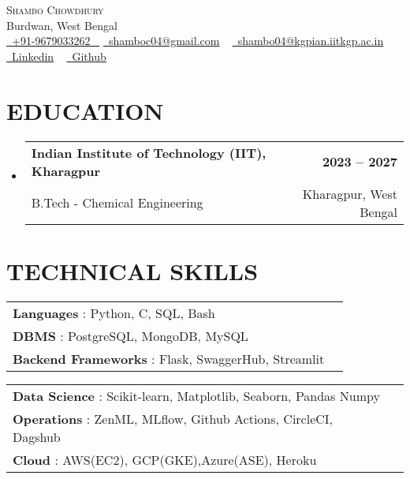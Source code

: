 \documentclass[letterpaper,11pt]{article}
\makeatletter
\newcommand{\resumeSubheading}[4]{
  \vspace{-2pt}\item
    \begin{tabular*}{1.0\textwidth}[t]{l@{\extracolsep{\fill}}r}
      \textbf{\large#1} & \textbf{\small #2} \\
      {\large#3} & {\small #4} \\
      
    \end{tabular*}\vspace{-7pt}
}
\newcommand{\resumeSubHeadingListStart}{\begin{itemize}[leftmargin=0.0in, label={}]}
\newcommand{\resumeSubHeadingListEnd}{\end{itemize}}
\makeatother
\begin{document}
\begin{center}
    {\Huge \scshape Shambo Chowdhury} \\ \vspace{1pt}
    Burdwan, West Bengal \\ \vspace{1pt}
    \small \href{tel:#}{ \raisebox{-0.1\height}\faPhone\ \underline{+91-9679033262} ~} 
    \href{mailto:shamboc04@gmail.com}{\raisebox{-0.2\height}\faEnvelope\  \underline{shamboc04@gmail.com}} ~ 
    \href{mailto:shambo04@kgpian.iitkgp.ac.in}{\raisebox{-0.2\height}\faEnvelope\  \underline{shambo04@kgpian.iitkgp.ac.in}} ~ 
    \href{https://linkedin.com/in/shambo04}{\raisebox{-0.2\height}\faLinkedinSquare\ \underline{Linkedin}}  ~
    \href{https://github.com/typhonshambo}{\raisebox{-0.2\height}\faGithub\ \underline{Github}} ~

\end{center}
 \vspace{0.5mm}


\section{EDUCATION}
  \resumeSubHeadingListStart
    \resumeSubheading
      {Indian Institute of Technology (IIT), Kharagpur}{2023 – 2027}
      {B.Tech - Chemical Engineering}{Kharagpur, West Bengal}
  \resumeSubHeadingListEnd
  

\section{TECHNICAL SKILLS}
\vspace{-5pt}
\begin{center}
\renewcommand{\arraystretch}{1.2}
\begin{minipage}[t]{0.47\textwidth}
\raggedright
\begin{tabularx}{\linewidth}{lX}
\textbf{Languages} : Python, C, SQL, Bash   \\
\textbf{DBMS } : PostgreSQL, MongoDB, MySQL \\
\textbf{Backend Frameworks} : Flask, SwaggerHub, Streamlit \\
\end{tabularx}
\end{minipage}%
\begin{minipage}[t]{0.53\textwidth}
\raggedright
\begin{tabularx}{\linewidth}{lX}

\textbf{Data Science} : Scikit-learn, Matplotlib, Seaborn, Pandas Numpy\\
\textbf{Operations} : ZenML, MLflow, Github Actions, CircleCI, Dagshub\\
\textbf{Cloud} : AWS(EC2), GCP(GKE),Azure(ASE), Heroku\\
\end{tabularx}
\end{minipage}
\end{center}
\end{document}
